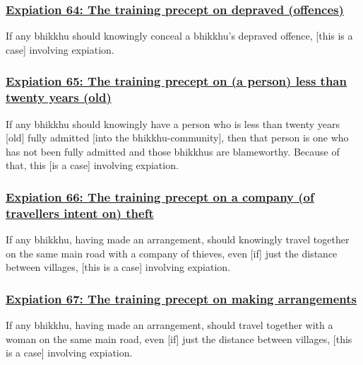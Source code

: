 \subsubsection*{\hyperref[pac64]{Expiation 64: The training precept on depraved (offences)}}
\label{exp64}
If any bhikkhu should knowingly conceal a bhikkhu's depraved offence, [this is a case] involving expiation.

\subsubsection*{\hyperref[pac65]{Expiation 65: The training precept on (a person) less than twenty years (old)}}
\label{exp65}
If any bhikkhu should knowingly have a person who is less than twenty years [old] fully admitted [into the bhikkhu-community], then that person is one who has not been fully admitted and those bhikkhus are blameworthy. Because of that, this [is a case] involving expiation.

\subsubsection*{\hyperref[pac66]{Expiation 66: The training precept on a company (of travellers intent on) theft}}
\label{exp66}
If any bhikkhu, having made an arrangement, should knowingly travel together on the same main road with a company of thieves, even [if] just the distance between villages, [this is a case] involving expiation.

\subsubsection*{\hyperref[pac67]{Expiation 67: The training precept on making arrangements}}
\label{exp67}
If any bhikkhu, having made an arrangement, should travel together with a woman on the same main road, even [if] just the distance between villages, [this is a case] involving expiation.

